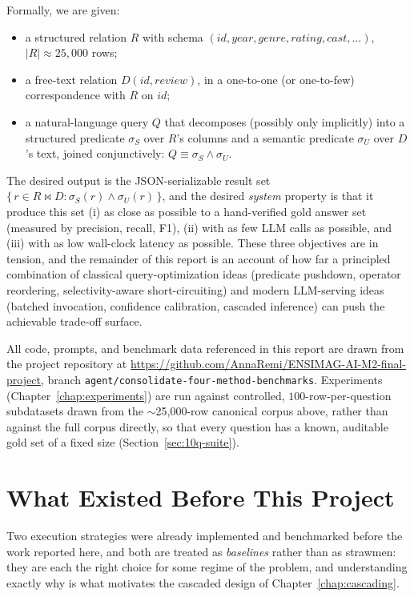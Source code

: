 Formally, we are given:
\begin{itemize}
  \item a structured relation $R$ with schema
        $(\mathit{id}, \mathit{year}, \mathit{genre}, \mathit{rating},
        \mathit{cast}, \dots)$, $|R| \approx 25{,}000$ rows;
  \item a free-text relation $D(\mathit{id}, \mathit{review})$, in a
        one-to-one (or one-to-few) correspondence with $R$ on
        $\mathit{id}$;
  \item a natural-language query $Q$ that decomposes (possibly only
        implicitly) into a structured predicate $\sigma_S$ over $R$'s
        columns and a semantic predicate $\sigma_U$ over $D$'s text,
        joined conjunctively: $Q \equiv \sigma_S \wedge \sigma_U$.
\end{itemize}
The desired output is the JSON-serializable result set
$\{\, r \in R \bowtie D : \sigma_S(r) \wedge \sigma_U(r) \,\}$, and the
desired \emph{system} property is that it produce this set (i) as close
as possible to a hand-verified gold answer set (measured by precision,
recall, F1), (ii) with as few LLM calls as possible, and (iii) with as
low wall-clock latency as possible. These three objectives are in
tension, and the remainder of this report is an account of how far a
principled combination of classical query-optimization ideas (predicate
pushdown, operator reordering, selectivity-aware short-circuiting) and
modern LLM-serving ideas (batched invocation, confidence calibration,
cascaded inference) can push the achievable trade-off surface.

All code, prompts, and benchmark data referenced in this report are
drawn from the project repository at
\url{https://github.com/AnnaRemi/ENSIMAG-AI-M2-final-project}, branch
\texttt{agent/consolidate-four-method-benchmarks}. Experiments
(Chapter~\ref{chap:experiments}) are run against controlled,
$100$-row-per-question subdatasets drawn from the $\sim$25{,}000-row
canonical corpus above, rather than against the full corpus directly,
so that every question has a known, auditable gold set of a fixed size
(Section~\ref{sec:10q-suite}).

\section{What Existed Before This Project}

Two execution strategies were already implemented and benchmarked before
the work reported here, and both are treated as \emph{baselines} rather
than as strawmen: they are each the right choice for some regime of the
problem, and understanding exactly why is what motivates the cascaded
design of Chapter~\ref{chap:cascading}.

